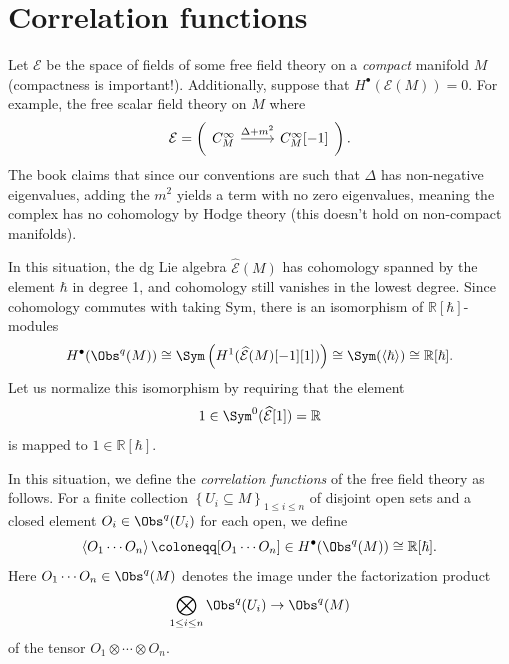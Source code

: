 \section{Correlation functions}

Let $\mathcal{E} $ be the space of fields of some free field theory on a \emph{compact} manifold $M$ (compactness is important!). Additionally, suppose that $H^{\bullet} (\mathcal{E} (M))=0$. For example, the free scalar field theory on $M$ where
\[
	\mathcal{E} =\left( 
	\begin{tikzcd}
		C^\infty _M \ar[" \Delta +m^2 ", r] & C^\infty _M[-1]
	\end{tikzcd}
	\right) 
.\]
The book claims that since our conventions are such that $\Delta $ has non-negative eigenvalues, adding the $m^2$ yields a term with no zero eigenvalues, meaning the complex has no cohomology by Hodge theory (this doesn't hold on non-compact manifolds).

In this situation, the dg Lie algebra $\widehat{\mathcal{E} }(M) $ has cohomology spanned by the element $\hbar $ in degree 1, and cohomology still vanishes in the lowest degree. Since cohomology commutes with taking Sym, there is an isomorphism of $\mathbb{R} [\hbar ]$-modules
\[
	H^{\bullet} (\Obs^{q} (M))\cong \Sym \left( H^1(\widehat{\mathcal{E} }(M)[-1][1]) \right) \cong \Sym (\langle\hbar\rangle)\cong \mathbb{R} [\hbar ]
.\]
Let us normalize this isomorphism by requiring that the element
\[
	1\in \Sym ^0(\widehat{\mathcal{E} }[1])=\mathbb{R}  
\]
is mapped to $1\in\mathbb{R} [\hbar ]$.

\begin{definition}\label{dfn:7-0-1}
	In this situation, we define the \emph{correlation functions} of the free field theory as follows. For a finite collection $\left\{ U_i \subseteq M \right\}_{1\leq i\leq n} $ of disjoint open sets and a closed element $O_i\in \Obs^{q} (U_i)$ for each open, we define
	\[
		\left\langle O_1 \cdots O_n \right\rangle \coloneqq [O_1 \cdots O_n]\in H^{\bullet} (\Obs^{q} (M))\cong \mathbb{R} [\hbar ]
	.\]
	Here $O_1 \cdots O_n\in \Obs^{q} (M)$ denotes the image under the factorization product
	\[
		\bigotimes_{1\leq i\leq n} \Obs^{q} (U_i) \to \Obs^{q} (M)
	\]
	of the tensor $O_1 \otimes \cdots \otimes O_n$.
\end{definition}


